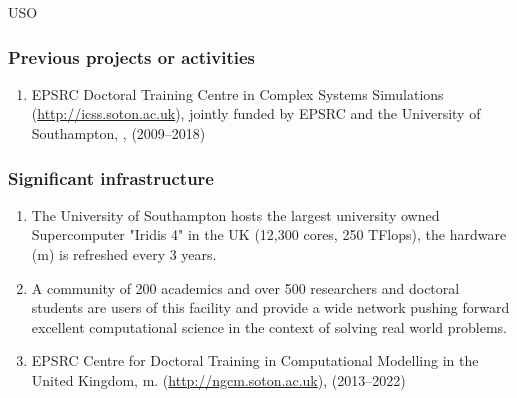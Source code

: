 \begin{sitedescription}{USO}
\subsubsection*{Previous projects or activities}

\begin{enumerate}
\item EPSRC Doctoral Training Centre in Complex Systems Simulations
  (\href{http://icss.soton.ac.uk}{http://icss.soton.ac.uk}), jointly
funded by EPSRC and the University of Southampton, , (2009--2018)
\end{enumerate}

\subsubsection*{Significant infrastructure}
\begin{enumerate}
\item The University of Southampton hosts the largest university owned
  Supercomputer "Iridis 4" in the UK (12,300 cores, 250 TFlops),
  the hardware (m) is refreshed every 3 years.
\item A community of 200 academics and over 500 researchers and
  doctoral students are users of this facility and provide a wide
  network pushing forward excellent computational science in the
  context of solving real world problems.
\item EPSRC Centre for Doctoral Training in Computational Modelling in
  the United Kingdom,
  m. (\href{http://ngcm.soton.ac.uk}{http://ngcm.soton.ac.uk}),
  (2013--2022)
\end{enumerate}
\end{sitedescription}

